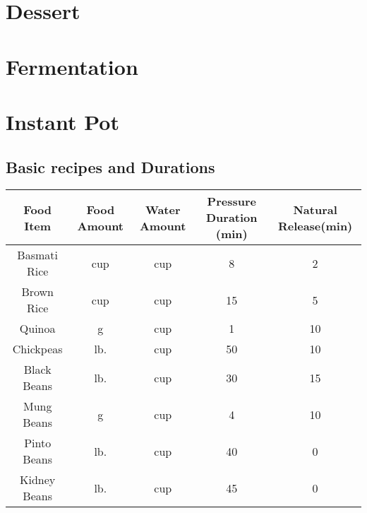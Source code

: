 \documentclass{article}
\begin{document}
\newpage


\newpage


\newpage
\section{Dessert}


\newpage


\newpage


\newpage


\newpage


\newpage


\newpage


\newpage


\newpage


\newpage


\newpage


\newpage
\section{Fermentation}


\section{Instant Pot}
\subsection{Basic recipes and Durations}
\begin{table}[H]
    \centering
    \begin{tabular}{c|c|c|c|c}
        Food Item & Food Amount & Water Amount & Pressure Duration (min) & Natural Release(min) \\ \hline
        Basmati Rice & \unit[1]{cup} & \unit[1]{cup} & 8 & 2\\ \hline
        Brown Rice & \unit[1]{cup} & \unit[1]{cup} & 15 & 5 \\ \hline
        Quinoa & \unit[190]{g} & \unit[1]{cup} & 1 & 10 \\ \hline
        Chickpeas & \unit[1]{lb.} & \unit[6]{cup} & 50 & 10 \\ \hline
        Black Beans & \unit[1]{lb.} & \unit[6]{cup} & 30 & 15 \\ \hline
        Mung Beans & \unit[205]{g} & \unit[3]{cup} & 4 & 10 \\ \hline
	Pinto Beans & \unit[1]{lb.} & \unit[6]{cup} & 40 & 0 \\ \hline
        Kidney Beans & \unit[1]{lb.} & \unit[6]{cup} & 45 & 0 \\ \hline
    \end{tabular}
    \label{tab:InstantPot}
\end{table}
\end{document}
